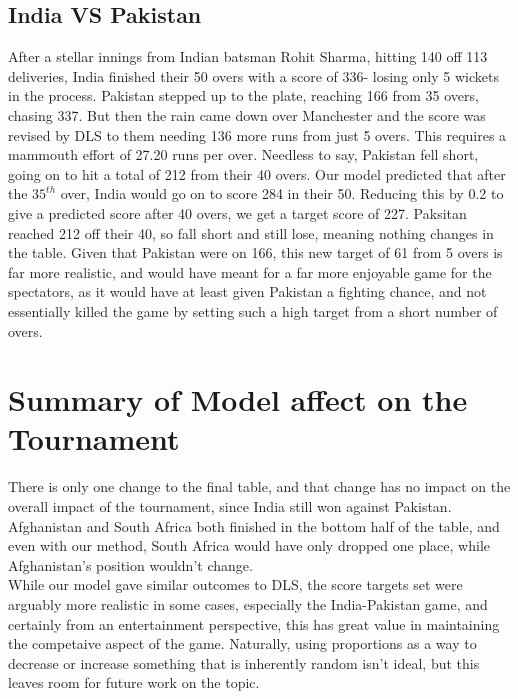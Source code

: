 \subsection{India VS Pakistan}
After a stellar innings from Indian batsman Rohit Sharma, hitting 140 off 113 deliveries, India finished their 50 overs with a score of 336- losing only 5 wickets in the process. Pakistan stepped up to the plate, reaching 
166 from 35 overs, chasing 337. But then the rain came down over Manchester and the score was revised by DLS to them needing 136 more runs from just 5 overs. This requires a mammouth effort of 27.20 runs per over. Needless to say,
Pakistan fell short, going on to hit a total of 212 from their 40 overs. Our model predicted that after the $35^{th}$ over, India would go on to score 284 in their 50. Reducing this by 0.2 to give a predicted score after 40 overs, 
we get a target score of 227. Paksitan reached 212 off their 40, so fall short and still lose, meaning nothing changes in the table. Given that Pakistan were on 166, this new target of 61 from 5 overs is far more realistic, and would have 
meant for a far more enjoyable game for the spectators, as it would have at least given Pakistan a fighting chance, and not essentially killed the game by setting such a high target from a short number 
of overs. 

\section{Summary of Model affect on the Tournament}
There is only one change to the final table, and that change has no impact on the overall impact of the tournament, since India still won against Pakistan. Afghanistan and South Africa both finished in the bottom 
half of the table, and even with our method, South Africa would have only dropped one place, while Afghanistan's position wouldn't change. \\

While our model gave similar outcomes to DLS, the score targets set were arguably more realistic in some cases, especially the India-Pakistan game, and certainly from an entertainment perspective, this 
has great value in maintaining the competaive aspect of the game. Naturally, using proportions as a way to decrease or increase something that is inherently random isn't ideal, but this leaves room for future work 
on the topic. 